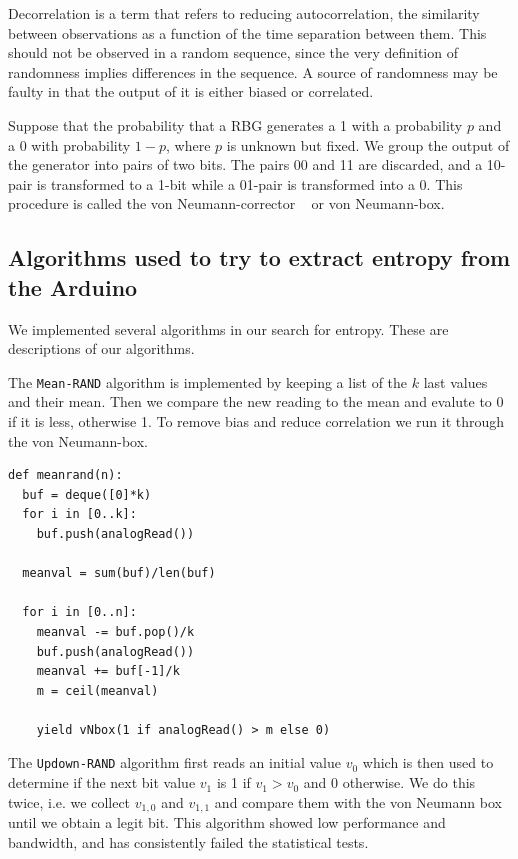 \documentclass[a4paper]{article}           %
\begin{document}
Decorrelation is a term that refers to reducing autocorrelation, the similarity between observations as a function of the time separation between them. This should not be observed in a random sequence, since the very definition of randomness implies differences in the sequence. A source of randomness may be faulty in that the output of it is either biased or correlated. 

Suppose that the probability that a RBG generates a 1 with a probability $p$ and a 0 with probability $1-p$, where $p$ is unknown but fixed. We group the output of the generator into pairs of two bits. The pairs 00 and 11 are discarded, and a 10-pair is transformed to a 1-bit while a 01-pair is transformed into a 0. This procedure is called the von Neumann-corrector ~\cite{menezes1996, intel} or von Neumann-box. 

\subsection{Algorithms used to try to extract entropy from the Arduino}
\label{sec:algs}

We implemented several algorithms in our search for entropy. These are descriptions of our algorithms. 

The \texttt{Mean-RAND} algorithm is implemented by keeping a list of the $k$ last values and their mean. Then we compare the new reading to the mean and evalute to 0 if it is less, otherwise 1. To remove bias and reduce correlation we run it through the von Neumann-box. 

\begin{lstlisting}[caption=The \texttt{Mean-RAND} algorithm in Python esque pseudocode]
def meanrand(n):
  buf = deque([0]*k)
  for i in [0..k]:
    buf.push(analogRead())

  meanval = sum(buf)/len(buf)

  for i in [0..n]:
    meanval -= buf.pop()/k
    buf.push(analogRead())
    meanval += buf[-1]/k
    m = ceil(meanval)

    yield vNbox(1 if analogRead() > m else 0)
  \end{lstlisting}

The \texttt{Updown-RAND} algorithm first reads an initial value $v_0$ which is then used to determine if the next bit value $v_1$ is 1 if $v_1 > v_0$ and 0 otherwise. We do this twice, i.e. we collect $v_{1,0}$ and $v_{1,1}$ and compare them with the von Neumann box until we obtain a legit bit. This algorithm showed low performance and bandwidth, and has consistently failed the statistical tests. 
\end{document}
